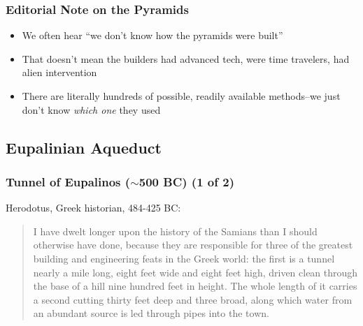 \begin{frame}
    \frametitle{Editorial Note on the Pyramids}

    \begin{itemize}[<+- | alert@+>]
        \item We often hear ``we don't know how the pyramids were built''
        \item That doesn't mean the builders had advanced tech, were time travelers, had alien intervention
        \item There are literally hundreds of possible, readily available methods--we just don't know \emph{which one} they used
    \end{itemize}
\end{frame}

\subsection{Eupalinian Aqueduct}

\begin{frame}
	\frametitle{Tunnel of Eupalinos ($\sim$500 BC) (1 of 2)}

    Herodotus, Greek historian, 484-425 BC:
    \begin{quote}
        I have dwelt longer upon the history of the Samians than I should otherwise have done, because they are responsible for three of the greatest building and engineering feats in the Greek world: the first is a tunnel nearly a mile long, eight feet wide and eight feet high, driven clean through the base of a hill nine hundred feet in height. The whole length of it carries a second cutting thirty feet deep and three broad, along which water from an abundant source is led through pipes into the town.
    \end{quote}
\end{frame}

